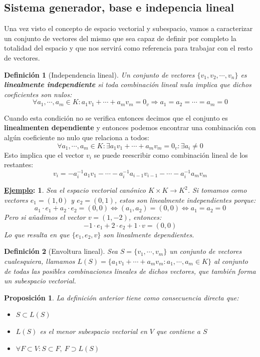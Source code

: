 \documentclass[10pt,a4paper,openright]{book}
\theoremstyle{break}
\newtheorem*{defi}{Definición}
\newtheorem*{prop}{Proposición}
\newtheorem*{ej}{\underline{Ejemplo}:}
\begin{document}
\subsection{Sistema generador, base e indepencia lineal}
Una vez visto el concepto de espacio vectorial y subespacio, vamos a caracterizar un conjunto de vectores del mismo que sea capaz de definir por completo la totalidad del espacio y que nos servirá como referencia para trabajar con el resto de vectores.

\begin{defi}[Independencia lineal]
Un conjunto de vectores $\{v_1, v_2, \cdots, v_n\}$ es \textbf{linealmente independiente} si toda combinación lineal nula implica que dichos coeficientes son nulos:
$$\forall a_1, \cdots, a_m\in K: a_1v_1+\cdots +a_mv_m=0_v\Rightarrow a_1=a_2=\cdots =a_m=0$$
\end{defi}

Cuando esta condición no se verifica entonces decimos que el conjunto es \textbf{linealmenten dependiente} y entonces podemos encontrar una combinación con algún coeficiente no nulo que relaciona a todos:
$$\forall a_1, \cdots, a_m\in K: \exists a_1v_1+\cdots +a_mv_m=0_v: \exists a_i\neq 0$$
Esto implica que el vector $v_i$ se puede reescribir como combinación lineal de los restantes:
$$v_i=-a_i^{-1}a_1v_1-\cdots-a_i^{-1}a_{i-1}v_{i-1}-\cdots-a_i^{-1}a_mv_m$$

\begin{ej}
Sea el espacio vectorial canónico $K\times K\rightarrow K^2$. Si tomamos como vectores $e_1=(1,0)$ y $e_2=(0,1)$, estos son linealmente independientes porque:
$$a_1\cdot e_1+a_2\cdot e_2=(0,0)\Leftrightarrow (a_1,a_2)=(0,0)\Leftrightarrow a_1=a_2=0$$
Pero si añadimos el vector $v=(1,-2)$, entonces:
$$-1\cdot e_1+ 2\cdot e_2+ 1\cdot v=(0,0)$$
Lo que resulta en que $\{e_1, e_2, v\}$ son linealmente dependientes.
\end{ej}

\begin{defi}[Envoltura lineal]
Sea $S = \{v_1, \cdots, v_m\}$ un conjunto de vectores cualesquiera, llamamos $L(S)=\{a_1v_1+\cdots + a_mv_m: a_1, \cdots, a_m\in K\}$ al conjunto de todas las posibles combinaciones lineales de dichos vectores, que también forma un subespacio vectorial.
\end{defi}
\begin{prop}
La definición anterior tiene como consecuencia directa que:
\begin{itemize}
\item $S\subset L(S)$
\item $L(S)$ es el menor subespacio vectorial en $V$ que contiene a $S$
\item $\forall F\subset V: S\subset F, \ F\supset L(S)$
\end{itemize}
\end{prop}
\end{document}
